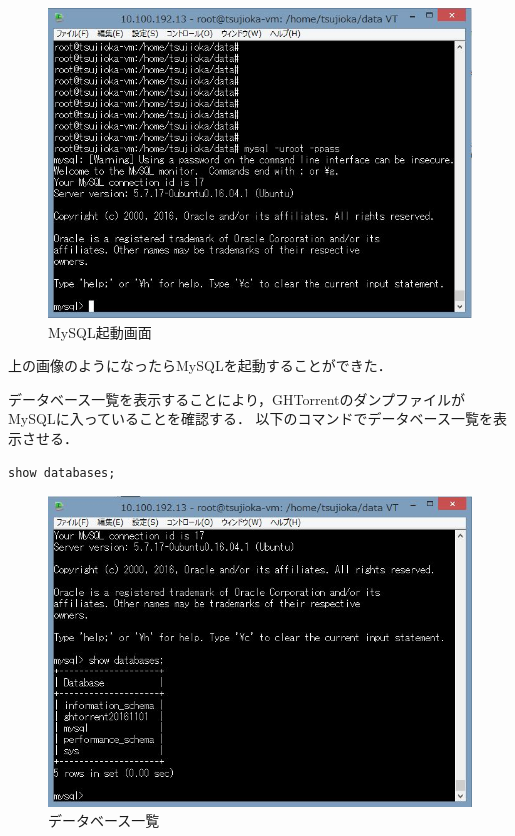 \begin{figure}[htb]
\centering
\includegraphics[width=12cm]{mysql.JPG}
\caption{MySQL起動画面}\label{サンプル図}
\end{figure}
上の画像のようになったらMySQLを起動することができた．
 

\newpage
データベース一覧を表示することにより，GHTorrentのダンプファイルがMySQLに入っていることを確認する．
以下のコマンドでデータベース一覧を表示させる．
\begin{lstlisting}[basicstyle=\ttfamily\footnotesize, frame=single]
show databases;
\end{lstlisting}
 
\begin{figure}[htb]
\centering
\includegraphics[width=12cm]{showdatabase.JPG}
\caption{データベース一覧}\label{サンプル図}
\end{figure}
 
